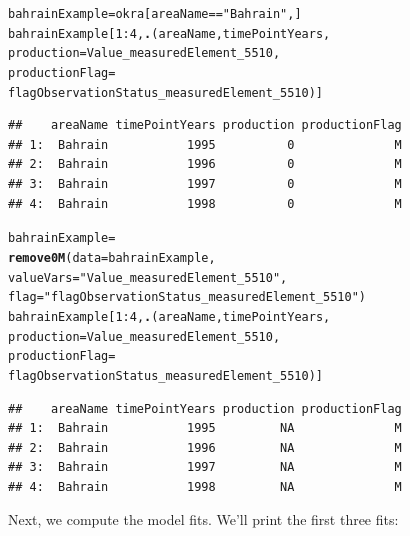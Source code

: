 \documentclass[nojss]{jss}\usepackage[]{graphicx}\usepackage[]{color}
\makeatletter
\newcommand{\hlnum}[1]{\textcolor[rgb]{0.686,0.059,0.569}{#1}}%
\newcommand{\hlstr}[1]{\textcolor[rgb]{0.192,0.494,0.8}{#1}}%
\newcommand{\hlopt}[1]{\textcolor[rgb]{0,0,0}{#1}}%
\newcommand{\hlstd}[1]{\textcolor[rgb]{0.345,0.345,0.345}{#1}}%
\newcommand{\hlkwb}[1]{\textcolor[rgb]{0.69,0.353,0.396}{#1}}%
\newcommand{\hlkwc}[1]{\textcolor[rgb]{0.333,0.667,0.333}{#1}}%
\newcommand{\hlkwd}[1]{\textcolor[rgb]{0.737,0.353,0.396}{\textbf{#1}}}%
\newenvironment{kframe}{%
 \def\at@end@of@kframe{}%
 \ifinner\ifhmode%
  \def\at@end@of@kframe{\end{minipage}}%
  \begin{minipage}{\columnwidth}%
 \fi\fi%
 \def\FrameCommand##1{\hskip\@totalleftmargin \hskip-\fboxsep
 \colorbox{shadecolor}{##1}\hskip-\fboxsep
     \hskip-\linewidth \hskip-\@totalleftmargin \hskip\columnwidth}%
 \MakeFramed {\advance\hsize-\width
   \@totalleftmargin\z@ \linewidth\hsize
   \@setminipage}}%
 {\par\unskip\endMakeFramed%
 \at@end@of@kframe}
\newenvironment{knitrout}{}{} %
\makeatother
\begin{document}
\begin{knitrout}
\color{fgcolor}\begin{kframe}
\begin{alltt}
\hlstd{bahrainExample} \hlkwb{=} \hlstd{okra[areaName} \hlopt{==} \hlstr{"Bahrain"}\hlstd{, ]}
\hlstd{bahrainExample[}\hlnum{1}\hlopt{:}\hlnum{4}\hlstd{,} \hlkwd{.}\hlstd{(areaName, timePointYears,}
                      \hlkwc{production} \hlstd{= Value_measuredElement_5510,}
                      \hlkwc{productionFlag} \hlstd{=}
                          \hlstd{flagObservationStatus_measuredElement_5510)]}
\end{alltt}
\begin{verbatim}
##    areaName timePointYears production productionFlag
## 1:  Bahrain           1995          0              M
## 2:  Bahrain           1996          0              M
## 3:  Bahrain           1997          0              M
## 4:  Bahrain           1998          0              M
\end{verbatim}
\begin{alltt}
\hlstd{bahrainExample} \hlkwb{=}
    \hlkwd{remove0M}\hlstd{(}\hlkwc{data} \hlstd{= bahrainExample,}
             \hlkwc{valueVars} \hlstd{=} \hlstr{"Value_measuredElement_5510"}\hlstd{,}
             \hlkwc{flag} \hlstd{=} \hlstr{"flagObservationStatus_measuredElement_5510"}\hlstd{)}
\hlstd{bahrainExample[}\hlnum{1}\hlopt{:}\hlnum{4}\hlstd{,} \hlkwd{.}\hlstd{(areaName, timePointYears,}
                      \hlkwc{production} \hlstd{= Value_measuredElement_5510,}
                      \hlkwc{productionFlag} \hlstd{=}
                          \hlstd{flagObservationStatus_measuredElement_5510)]}
\end{alltt}
\begin{verbatim}
##    areaName timePointYears production productionFlag
## 1:  Bahrain           1995         NA              M
## 2:  Bahrain           1996         NA              M
## 3:  Bahrain           1997         NA              M
## 4:  Bahrain           1998         NA              M
\end{verbatim}
\end{kframe}
\end{knitrout}

Next, we compute the model fits.  We'll print the first three fits:
\end{document}
